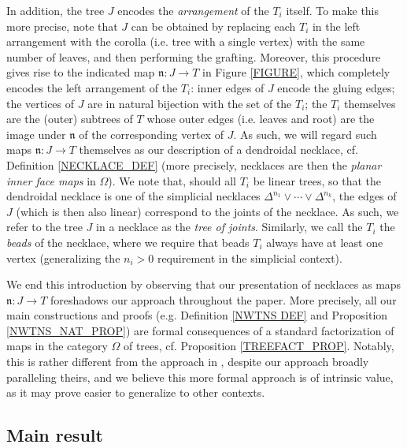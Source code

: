 \documentclass{hha}
\theoremstyle{definition} %
\begin{document}
In addition, the tree $J$ encodes the \emph{arrangement}
of the $T_i$ itself. 
To make this more precise,
note that $J$ can be obtained by replacing each $T_i$ 
in the left arrangement with the corolla (i.e. tree with a single vertex) with the same number of leaves,
and then performing the grafting.
Moreover, this procedure gives rise to the indicated map
$\mathfrak{n} \colon J \to T$
in Figure \ref{FIGURE},
which completely encodes the left arrangement of the $T_i$: 
inner edges of $J$ encode the gluing edges;
the vertices of $J$ are in natural bijection with the set of the $T_i$; the $T_i$ themselves are the (outer) subtrees of $T$ whose outer edges (i.e. leaves and root)
are the image under $\mathfrak{n}$
of the corresponding vertex of $J$.
As such, we will regard such maps 
$\mathfrak{n} \colon J \to T$ themselves 
as our description of a dendroidal necklace,
cf. Definition \ref{NECKLACE_DEF}
(more precisely, necklaces are then the 
\emph{planar inner face maps} in $\Omega$).
We note that, should all $T_i$ be linear trees, so that the dendroidal necklace is one of the simplicial necklaces
$\Delta^{n_1} \vee \cdots \vee \Delta^{n_k}$,
the edges of $J$ (which is then also linear) correspond to the joints of the necklace. 
As such, we refer to the tree $J$ in a necklace as the 
\emph{tree of joints}. Similarly, we call the $T_i$ the \emph{beads} of the necklace, where we require that beads $T_i$ always have at least one vertex (generalizing the $n_i>0$ requirement in the simplicial context).

We end this introduction by observing that our presentation of necklaces as maps $\mathfrak{n} \colon J \to T$
foreshadows our approach throughout the paper.
More precisely, all our main constructions and proofs
(e.g. Definition \ref{NWTNS DEF} and
Proposition \ref{NWTNS_NAT_PROP})
are formal consequences of a standard factorization of maps in the category $\Omega$ of trees, cf. Proposition \ref{TREEFACT_PROP}.
Notably, this is rather different from the approach in \cite{DS11},
despite our approach broadly paralleling theirs,
and we believe this more formal approach is of intrinsic value,
as it may prove easier to generalize to other contexts.




\subsection{Main result}
\label{MAINRESULT_SEC}
\end{document}
